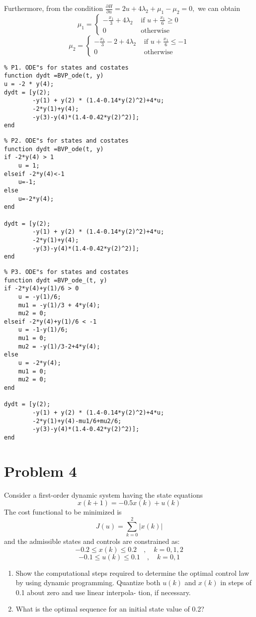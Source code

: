 \documentclass[10pt,a4paper,oneside]{article}
\begin{document}
\begin{enumerate}
\[\]
Furthermore, from the condition $\frac{\partial H}{\partial u}=2 u+4 \lambda_{2}+\mu_{1}-\mu_{2}=0,$ we can obtain
\[
\mu_{1}=\left\{\begin{array}{ll}{-\frac{x_{1}}{3}+4 \lambda_{2}} & {\text { if } u+\frac{x_{1}}{6} \geq 0} \\ {0} & {\text { otherwise }}\end{array}\right.
\]
\[
\mu_{2}=\left\{\begin{array}{ll}{-\frac{x_{1}}{3}-2+4 \lambda_{2}} & {\text { if } u+\frac{x_{1}}{6} \leq-1} \\ {0} & {\text { otherwise }}\end{array}\right.
\]
\begin{lstlisting}
% P1. ODE"s for states and costates
function dydt =BVP_ode(t, y)
u = -2 * y(4);
dydt = [y(2); 
		-y(1) + y(2) * (1.4-0.14*y(2)^2)+4*u;
		-2*y(1)+y(4);
		-y(3)-y(4)*(1.4-0.42*y(2)^2)];
end
\end{lstlisting}
\begin{lstlisting}
% P2. ODE"s for states and costates
function dydt =BVP_ode(t, y)
if -2*y(4) > 1
	u = 1;
elseif -2*y(4)<-1
	u=-1;
else
	u=-2*y(4);
end

dydt = [y(2); 
		-y(1) + y(2) * (1.4-0.14*y(2)^2)+4*u;
		-2*y(1)+y(4);
		-y(3)-y(4)*(1.4-0.42*y(2)^2)];
end
\end{lstlisting}
\begin{lstlisting}
% P3. ODE"s for states and costates
function dydt =BVP_ode_(t, y)
if -2*y(4)+y(1)/6 > 0
	u = -y(1)/6;
	mu1 = -y(1)/3 + 4*y(4);
	mu2 = 0;
elseif -2*y(4)+y(1)/6 < -1
	u = -1-y(1)/6;
	mu1 = 0;
	mu2 = -y(1)/3-2+4*y(4);
else
	u = -2*y(4);
	mu1 = 0;
	mu2 = 0;
end

dydt = [y(2); 
		-y(1) + y(2) * (1.4-0.14*y(2)^2)+4*u;
		-2*y(1)+y(4)-mu1/6+mu2/6;
		-y(3)-y(4)*(1.4-0.42*y(2)^2)];
end
\end{lstlisting}
\end{enumerate}
\section* {Problem 4} 
Consider a first-order dynamic system having the state equations
\[
x(k+1)=-0.5 x(k)+u(k)
\]
The cost functional to be minimized is
\[
J(u)=\sum_{k=0}^{2}|x(k)|
\]
and the admissible states and controls are constrained as:
\[
-0.2 \leq x(k) \leq 0.2 \quad, \quad k=0,1,2
\]
\[
-0.1 \leq u(k) \leq 0.1 \quad, \quad k=0,1
\]
\begin{enumerate}
\item Show the computational steps required to determine the optimal control law by using dynamic
programming. Quantize both $u(k)$ and $x(k)$ in steps of 0.1 about zero and use linear interpola-
tion, if necessary.
\item What is the optimal sequence for an initial state value of 0.2?
\end{enumerate}
\end{document}
